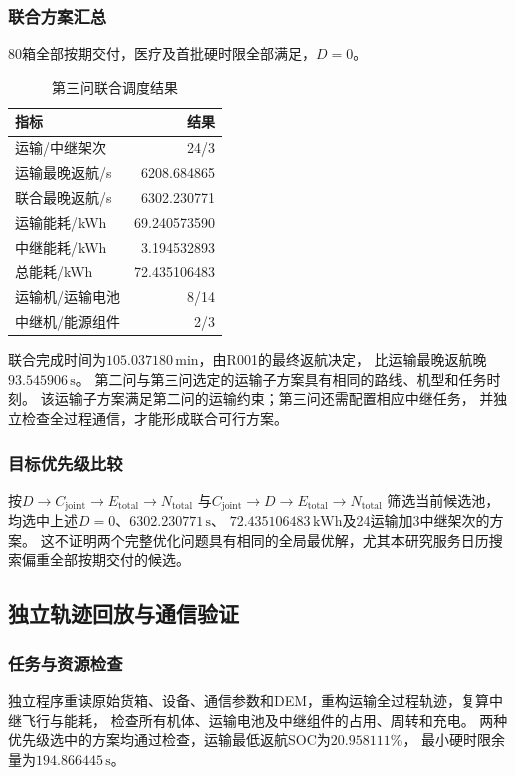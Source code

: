 \documentclass[bwprint]{gmcmthesis}
\begin{document}
\subsubsection{联合方案汇总}
80箱全部按期交付，医疗及首批硬时限全部满足，$D=0$。
\begin{table}[htbp]
\centering
\small
\caption{第三问联合调度结果}
\label{tab:q3_summary}
\begin{tabular}{lr}
\toprule
指标 & 结果 \\
\midrule
运输/中继架次 & 24/3 \\
运输最晚返航/s & 6208.684865 \\
联合最晚返航/s & 6302.230771 \\
运输能耗/kWh & 69.240573590 \\
中继能耗/kWh & 3.194532893 \\
总能耗/kWh & 72.435106483 \\
运输机/运输电池 & 8/14 \\
中继机/能源组件 & 2/3 \\
\bottomrule
\end{tabular}
\end{table}

联合完成时间为$105.037180\,\mathrm{min}$，由R001的最终返航决定，
比运输最晚返航晚$93.545906\,\mathrm{s}$。
第二问与第三问选定的运输子方案具有相同的路线、机型和任务时刻。
该运输子方案满足第二问的运输约束；第三问还需配置相应中继任务，
并独立检查全过程通信，才能形成联合可行方案。

\subsubsection{目标优先级比较}
按$D\rightarrow C_{\mathrm{joint}}\rightarrow E_{\mathrm{total}}\rightarrow N_{\mathrm{total}}$
与$C_{\mathrm{joint}}\rightarrow D\rightarrow E_{\mathrm{total}}\rightarrow N_{\mathrm{total}}$
筛选当前候选池，均选中上述$D=0$、$6302.230771\,\mathrm{s}$、
$72.435106483\,\mathrm{kWh}$及24运输加3中继架次的方案。
这不证明两个完整优化问题具有相同的全局最优解，尤其本研究服务日历搜索偏重全部按期交付的候选。

\subsection{独立轨迹回放与通信验证}
\subsubsection{任务与资源检查}
独立程序重读原始货箱、设备、通信参数和DEM，重构运输全过程轨迹，复算中继飞行与能耗，
检查所有机体、运输电池及中继组件的占用、周转和充电。
两种优先级选中的方案均通过检查，运输最低返航SOC为$20.958111\%$，
最小硬时限余量为$194.866445\,\mathrm{s}$。
\end{document}
